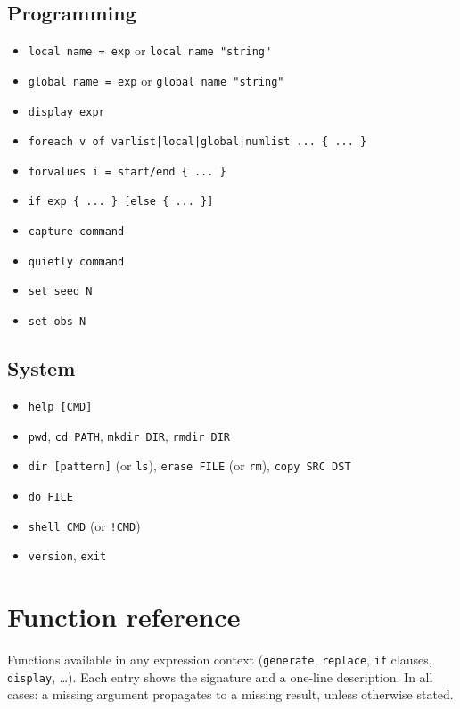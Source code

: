 \documentclass[11pt,letterpaper]{article}
\begin{document}
\subsection*{Programming}
\begin{itemize}[leftmargin=*,itemsep=0pt]
\item \texttt{local name = exp} or \texttt{local name "string"}
\item \texttt{global name = exp} or \texttt{global name "string"}
\item \texttt{display expr}
\item \texttt{foreach v of varlist|local|global|numlist ... \{ ... \}}
\item \texttt{forvalues i = start/end \{ ... \}}
\item \texttt{if exp \{ ... \} [else \{ ... \}]}
\item \texttt{capture command}
\item \texttt{quietly command}
\item \texttt{set seed N}
\item \texttt{set obs N}
\end{itemize}

\subsection*{System}
\begin{itemize}[leftmargin=*,itemsep=0pt]
\item \texttt{help [CMD]}
\item \texttt{pwd}, \texttt{cd PATH}, \texttt{mkdir DIR}, \texttt{rmdir DIR}
\item \texttt{dir [pattern]} (or \texttt{ls}), \texttt{erase FILE} (or \texttt{rm}), \texttt{copy SRC DST}
\item \texttt{do FILE}
\item \texttt{shell CMD} (or \texttt{!CMD})
\item \texttt{version}, \texttt{exit}
\end{itemize}

\section{Function reference}

Functions available in any expression context (\texttt{generate},
\texttt{replace}, \texttt{if} clauses, \texttt{display}, \ldots).
Each entry shows the signature and a one-line description.  In all
cases: a missing argument propagates to a missing result, unless
otherwise stated.
\end{document}
